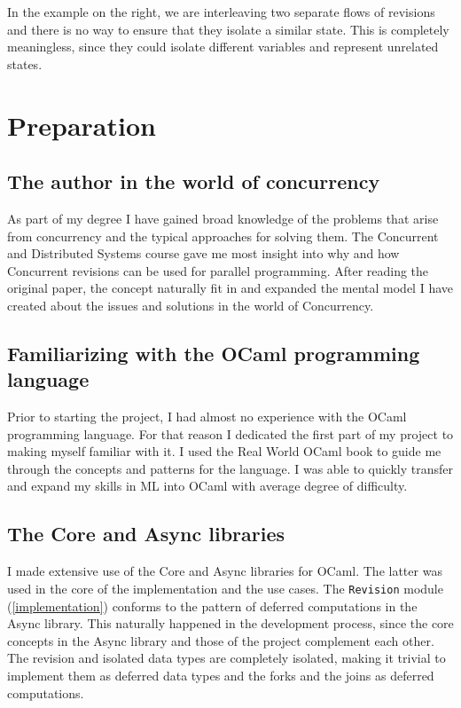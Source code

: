 \documentclass[12pt,twoside,notitlepage]{report}
\begin{document}
In the example on the right, we are interleaving two separate flows of revisions and there is no way to ensure that they isolate a similar state. This is completely meaningless, since they could isolate different variables and represent unrelated states.





\cleardoublepage



\chapter{Preparation}
\section{The author in the world of concurrency}
As part of my degree I have gained broad knowledge of the problems that arise from concurrency and the typical approaches for solving them. The Concurrent and Distributed Systems course gave me most insight into why and how Concurrent revisions can be used for parallel programming. After reading the original paper, the concept naturally fit in and expanded the mental model I have created about the issues and solutions in the world of Concurrency.  

\section{Familiarizing with the OCaml programming language}
Prior to starting the project, I had almost no experience with the OCaml programming language. For that reason I dedicated the first part of my project to making myself familiar with it. I used the Real World OCaml book \cite{realocaml} to guide me through the concepts and patterns for the language. I was able to quickly transfer and expand my skills in ML into OCaml with average degree of difficulty.

\section{The Core and Async libraries}
I made extensive use of the Core and Async libraries for OCaml. The latter was used in the core of the implementation and the use cases. The {\tt Revision} module (\ref{implementation}) conforms to the pattern of deferred computations in the Async library. This naturally happened in the development process, since the core concepts in the Async library and those of the project complement each other. The revision and isolated data types are completely isolated, making it trivial to implement them as deferred data types and the forks and the joins as deferred computations.  
\end{document}
